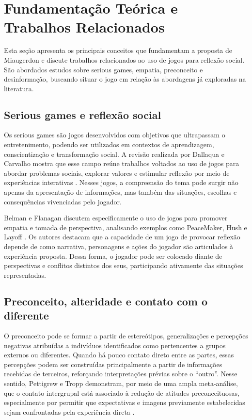 \documentclass[12pt]{article}
\begin{document}
\section{Fundamentação Teórica e Trabalhos Relacionados}

Esta seção apresenta os principais conceitos que fundamentam a proposta de Miaugerdon e discute trabalhos relacionados ao uso de jogos para reflexão social. São abordados estudos sobre serious games, empatia, preconceito e desinformação, buscando situar o jogo em relação às abordagens já exploradas na literatura.

\subsection{Serious games e reflexão social}
Os serious games são jogos desenvolvidos com objetivos que ultrapassam o entretenimento, podendo ser utilizados em contextos de aprendizagem, conscientização e transformação social. A revisão realizada por Dallaqua e Carvalho mostra que esse campo reúne trabalhos voltados ao uso de jogos para abordar problemas sociais, explorar valores e estimular reflexão por meio de experiências interativas \cite{dallaqua}. Nesses jogos, a compreensão do tema pode surgir não apenas da apresentação de informações, mas também das situações, escolhas e consequências vivenciadas pelo jogador.

Belman e Flanagan discutem especificamente o uso de jogos para promover empatia e tomada de perspectiva, analisando exemplos como PeaceMaker, Hush e Layoff \cite{Belman2009}. Os autores destacam que a capacidade de um jogo de provocar reflexão depende de como narrativa, personagens e ações do jogador são articulados à experiência proposta. Dessa forma, o jogador pode ser colocado diante de perspectivas e conflitos distintos dos seus, participando ativamente das situações representadas.

\subsection{Preconceito, alteridade e contato com o diferente}
O preconceito pode se formar a partir de estereótipos, generalizações e percepções negativas atribuídas a indivíduos identificados como pertencentes a grupos externos ou diferentes. Quando há pouco contato direto entre as partes, essas percepções podem ser construídas principalmente a partir de informações recebidas de terceiros, reforçando interpretações prévias sobre o ``outro''. Nesse sentido, Pettigrew e Tropp demonstram, por meio de uma ampla meta-análise, que o contato intergrupal está associado à redução de atitudes preconceituosas, especialmente por permitir que expectativas e imagens previamente estabelecidas sejam confrontadas pela experiência direta \cite{Pettigrew2006}.
\end{document}
